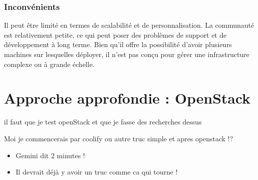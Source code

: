 \documentclass{report} %
\begin{document}
\subsubsection{Inconvénients}
Il peut être limité en termes de scalabilité et de personnalisation. La communauté est relativement petite, ce qui peut poser des problèmes de support et de développement à long terme.
Bien qu'il offre la possibilité d'avoir plusieurs machines sur lesquelles déployer, il n'est pas conçu pour gérer une infrastructure complexe ou à grande échelle.

\section{Approche approfondie : OpenStack}
il faut que je test openStack et que je fasse des recherches dessus


{\color{red} 
Moi je commencerais par coolify ou autre truc simple et apres openstack !?

\begin{itemize}
\item Gemini dit 2 minutes ! 
\item Il devrait déjà y avoir un truc comme ca qui tourne !
\end{itemize}
}
\end{document}
